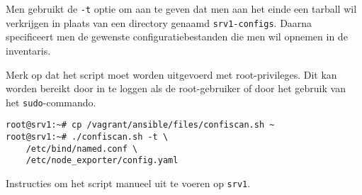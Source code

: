 Men gebruikt de \texttt{-t} optie om aan te geven dat men aan het einde een tarball wil verkrijgen in plaats van een directory genaamd \texttt{srv1-configs}.
Daarna specificeert men de gewenste configuratiebestanden die men wil opnemen in de inventaris.

Merk op dat het script moet worden uitgevoerd met root-privileges.
Dit kan worden bereikt door in te loggen als de root-gebruiker of door het gebruik van het \texttt{sudo}-commando.

\begin{listing}
  \begin{verbatim}
root@srv1:~# cp /vagrant/ansible/files/confiscan.sh ~
root@srv1:~# ./confiscan.sh -t \
    /etc/bind/named.conf \
    /etc/node_exporter/config.yaml
  \end{verbatim}
  \caption[Manueel uitvoeren van script op \texttt{srv1}.]{Instructies om het script manueel uit te voeren op \texttt{srv1}.}
  \label{lst:bijlage-run-script-manual}
\end{listing}
